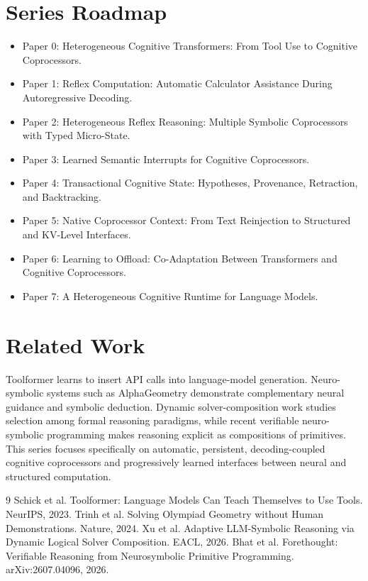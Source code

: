 \documentclass[11pt]{article}
\begin{document}
\section{Series Roadmap}
\begin{itemize}
\item Paper 0: Heterogeneous Cognitive Transformers: From Tool Use to Cognitive Coprocessors.
\item Paper 1: Reflex Computation: Automatic Calculator Assistance During Autoregressive Decoding.
\item Paper 2: Heterogeneous Reflex Reasoning: Multiple Symbolic Coprocessors with Typed Micro-State.
\item Paper 3: Learned Semantic Interrupts for Cognitive Coprocessors.
\item Paper 4: Transactional Cognitive State: Hypotheses, Provenance, Retraction, and Backtracking.
\item Paper 5: Native Coprocessor Context: From Text Reinjection to Structured and KV-Level Interfaces.
\item Paper 6: Learning to Offload: Co-Adaptation Between Transformers and Cognitive Coprocessors.
\item Paper 7: A Heterogeneous Cognitive Runtime for Language Models.
\end{itemize}

\section{Related Work}
Toolformer learns to insert API calls into language-model generation. Neuro-symbolic systems such as AlphaGeometry demonstrate complementary neural guidance and symbolic deduction. Dynamic solver-composition work studies selection among formal reasoning paradigms, while recent verifiable neuro-symbolic programming makes reasoning explicit as compositions of primitives. This series focuses specifically on automatic, persistent, decoding-coupled cognitive coprocessors and progressively learned interfaces between neural and structured computation.


\begin{thebibliography}{9}
 Schick et al. Toolformer: Language Models Can Teach Themselves to Use Tools. NeurIPS, 2023.
 Trinh et al. Solving Olympiad Geometry without Human Demonstrations. Nature, 2024.
 Xu et al. Adaptive LLM-Symbolic Reasoning via Dynamic Logical Solver Composition. EACL, 2026.
 Bhat et al. Forethought: Verifiable Reasoning from Neurosymbolic Primitive Programming. arXiv:2607.04096, 2026.
\end{thebibliography}
\end{document}
